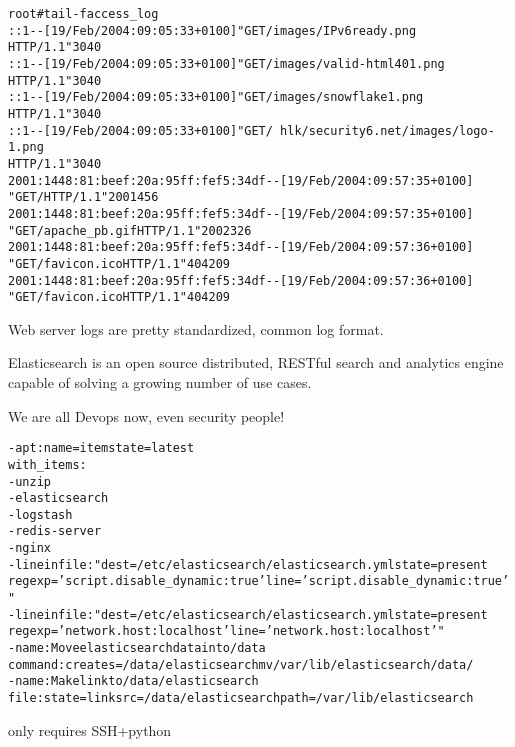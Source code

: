 \documentclass[Screen16to9,17pt]{foils}
\begin{document}





\begin{alltt}
\footnotesize
root# tail -f access_log
::1 - - [19/Feb/2004:09:05:33 +0100] "GET /images/IPv6ready.png
HTTP/1.1" 304 0
::1 - - [19/Feb/2004:09:05:33 +0100] "GET /images/valid-html401.png
HTTP/1.1" 304 0
::1 - - [19/Feb/2004:09:05:33 +0100] "GET /images/snowflake1.png
HTTP/1.1" 304 0
::1 - - [19/Feb/2004:09:05:33 +0100] "GET /~hlk/security6.net/images/logo-1.png
HTTP/1.1" 304 0
2001:1448:81:beef:20a:95ff:fef5:34df - - [19/Feb/2004:09:57:35 +0100]
"GET / HTTP/1.1" 200 1456
2001:1448:81:beef:20a:95ff:fef5:34df - - [19/Feb/2004:09:57:35 +0100]
"GET /apache_pb.gif HTTP/1.1" 200 2326
2001:1448:81:beef:20a:95ff:fef5:34df - - [19/Feb/2004:09:57:36 +0100]
"GET /favicon.ico HTTP/1.1" 404 209
2001:1448:81:beef:20a:95ff:fef5:34df - - [19/Feb/2004:09:57:36 +0100]
"GET /favicon.ico HTTP/1.1" 404 209
\end{alltt}
\vskip 1cm

Web server logs are pretty standardized, common log format.




Elasticsearch is an open source distributed, RESTful search and analytics engine capable of solving a growing number of use cases.


\vskip 1cm
\centerline{We are all Devops now, even security people!}




\begin{alltt}\small
- apt: name={{ item }} state=latest
  with_items:
        - unzip
        - elasticsearch
        - logstash
        - redis-server
        - nginx
- lineinfile: "dest=/etc/elasticsearch/elasticsearch.yml state=present
  regexp='script.disable_dynamic: true' line='script.disable_dynamic: true'"
- lineinfile: "dest=/etc/elasticsearch/elasticsearch.yml state=present
  regexp='network.host: localhost' line='network.host: localhost'"
- name: Move elasticsearch data into /data
  command: creates=/data/elasticsearch mv /var/lib/elasticsearch /data/
- name: Make link to /data/elasticsearch
  file: state=link src=/data/elasticsearch path=/var/lib/elasticsearch
\end{alltt}
\vskip 5mm
\centerline{only requires SSH+python }
\end{document}
